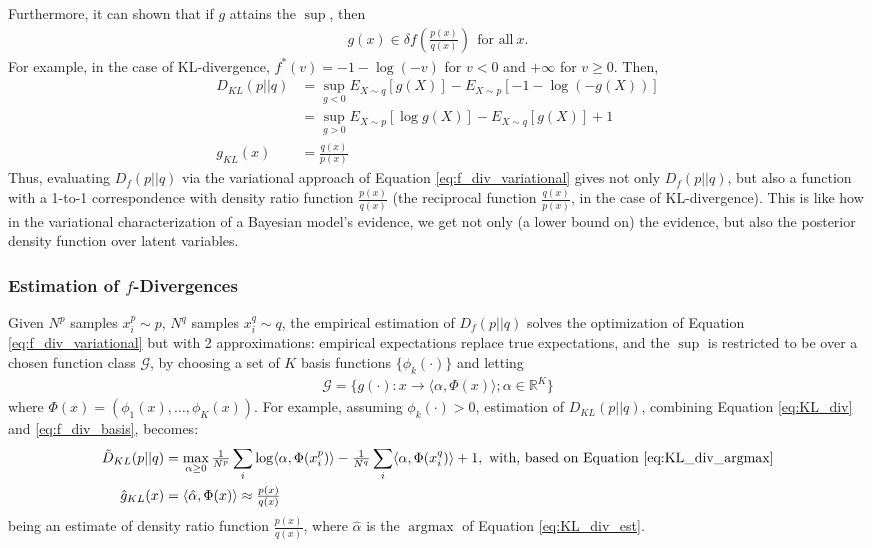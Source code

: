 \documentclass[8pt]{article}
\begin{document}
Furthermore, it can shown that \cite{nguyen2007estimating} if $g$ attains the $\sup$, then 
\begin{align}
g(x) \in \delta f(\tfrac{p(x)}{q(x)})\ \ \text{for all}\ x. \label{eq:f_div_argmax}
\end{align}
For example, in the case of KL-divergence,
$f^*(v) = -1 - \log(-v)$ for $v<0$ and $+\infty$ for
$v \geq 0$.  Then,%
\begin{align}
D_{KL}(p||q) &= \sup_{g < 0}E_{X\sim q}[g(X)] - E_{X\sim p}[-1 -
\log(-g(X))] \\&= \sup_{g > 0} E_{X\sim p}[\log g(X)] - E_{X\sim
q}[g(X)] + 1 \label{eq:KL_div}\\
g_{KL}(x) &= \tfrac{q(x)}{p(x)}\label{eq:KL_div_argmax}
\end{align}
Thus, evaluating $D_f(p||q)$ via the variational approach of Equation
\ref{eq:f_div_variational} gives not only $D_f(p||q)$, but also a
function with a 1-to-1 correspondence with density ratio function
$\tfrac{p(x)}{q(x)}$ (the reciprocal
function $\tfrac{q(x)}{p(x)}$, in the case of KL-divergence).  This is like how in the variational characterization
of a Bayesian model's evidence, we get not only (a lower bound on)
the evidence, but also the posterior density function over latent
variables.

\subsubsection{Estimation of $f$-Divergences}
Given $N^p$ samples
$x_i^p \sim p$, $N^q$ samples $x_i^q\sim q$, the empirical estimation of $D_f(p||q)$ solves the optimization of Equation
\ref{eq:f_div_variational} but with 2 approximations: empirical
expectations replace true expectations, and 
the $\sup$ is restricted to be over a chosen function class $\mathcal{G}$, by choosing a set of $K$ basis
functions $\{\phi_k(\cdot)\}$ and letting 
\begin{align}
\mathcal{G} = \{g(\cdot):x\rightarrow  \langle\alpha, \Phi(x)\rangle; \alpha \in \mathbb{R}^K\}\label{eq:f_div_basis}
\end{align}
where $\Phi(x)=(\phi_1(x),\dots,\phi_K(x))$.
For example, assuming $\phi_k(\cdot)>0$, estimation of $D_{KL}(p||q)$,
combining Equation
\ref{eq:KL_div} and \ref{eq:f_div_basis}, becomes:
\begin{align}
\tilde{D}_{KL}(p||q) &= \max_{\alpha \geq 0}\tfrac{1}{N^p}\sum_i \log
\langle\alpha,\Phi(x_i^p)\rangle - \tfrac{1}{N^q} \sum_i \langle\alpha,
\Phi(x_i^q)\rangle + 1,\ \text{with, based on Equation
  \ref{eq:KL_div_argmax}} \label{eq:KL_div_est}\\
\hat{g}_{KL}(x) &=\langle\hat{\alpha},\Phi(x)\rangle \approx \tfrac{p(x)}{q(x)}
\end{align}
being an estimate of density ratio function $\tfrac{p(x)}{q(x)}$,
where $\hat{\alpha}$ is the $\operatorname{argmax}$ of Equation
\ref{eq:KL_div_est}.
\end{document}
